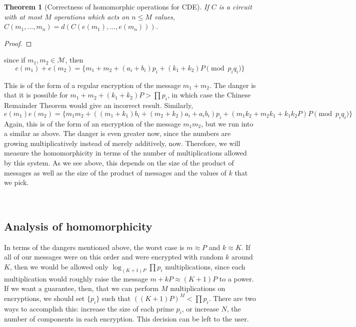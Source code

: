 \documentclass[11pt]{report}
\newtheorem{thm}{Theorem}
\newcommand{\M}{\mathcal{M}}
\begin{document}
\begin{thm}[Correctness of homomorphic operations for CDE]
If $C$ is a circuit with at most $M$ operations which acts on $n\leq M$ values, $C(m_1,\dots,m_n) = d(C(e(m_1),\dots,e(m_n)))$.
\end{thm}

\begin{proof}

\end{proof}

 since if $m_1, m_2 \in \M$, then \begin{equation} e(m_1) + e(m_2) = \{m_1+m_2 + (a_i+b_i)p_i + (k_1+k_2)P \pmod{p_iq_i}\} \end{equation}

This is of the form of a regular encryption of the message $m_1+m_2$. The danger is that it is possible for $m_1+m_2+(k_1+k_2)P>\prod p_i$, in which case the Chinese Remainder Theorem would give an incorrect result. Similarly,
\begin{equation} e(m_1)e(m_2) = \{m_1m_2+((m_1+k_1)b_i+(m_2+k_2)a_i+a_ib_i)p_i+(m_1k_2+m_2k_1+k_1k_2P)P \pmod{p_iq_i}\}\end{equation}
Again, this is of the form of an encryption of the message $m_1m_2$, but we run into a similar as above. The danger is even greater now, since the numbers are growing multiplicatively instead of merely additively, now. Therefore, we will measure the homomorphicity in terms of the number of multiplications allowed by this system. As we see above, this depends on the size of the product of messages as well as the size of the product of messages and the values of $k$ that we pick.

\

\subsection{Analysis of homomorphicity}
\label{sec:choice_hom_analysis}

In terms of the dangers mentioned above, the worst case is $m\approx P$ and $k\approx K$. If all of our messages were on this order and were encrypted with random $k$ around $K$, then we would be allowed only $\log_{(K+1)P}\prod p_i$ multiplications, since each multiplication would roughly raise the message $m+kP \approx (K+1)P$ to a power. If we want a guarantee, then, that we can perform $M$ multiplications on encryptions, we should set $\{p_i\}$ such that $((K+1)P)^M < \prod p_i$. There are two ways to accomplish this: increase the size of each prime $p_i$, or increase $N$, the number of components in each encryption. This decision can be left to the user.
\end{document}
